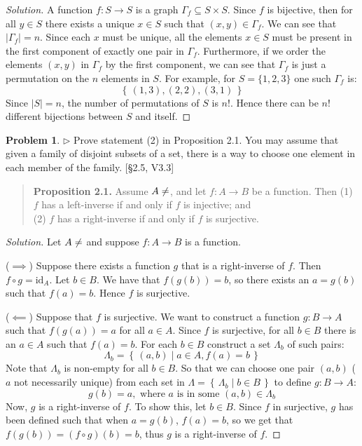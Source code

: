 \documentclass[fontsize=14pt]{scrartcl}
\theoremstyle{definition}
\newtheorem{problem-internal}{Problem}[subsection]
\newenvironment{problem}{
  \medskip
  \begin{problem-internal}
}{
  \end{problem-internal}
}
\newenvironment{solution}{
  \begin{proof}[Solution]
  \vspace{-8px}
  \setlength{\parskip}{4px}
  \setlength{\parindent}{0px}
}{
  \end{proof}
}
\newcommand{\set}[1]{\left\{\,#1\,\right\}}
\newcommand{\id}{\mathrm{id}}
\newcommand{\abs}[1]{\left|#1\right|}
\begin{document}
\begin{solution}
A function $f:S\to S$ is a graph $\Gamma_f\subseteq S\times S$. Since $f$ is
bijective, then for all $y\in S$ there exists a unique $x\in S$ such that
$(x,y)\in\Gamma_f$. We can see that $\abs{\Gamma_f} = n$. Since each $x$ must be
unique, all the elements $x\in S$ must be present in the first component of
exactly one pair in $\Gamma_f$. Furthermore, if we order the elements $(x,y)$ in
$\Gamma_f$ by the first component, we can see that $\Gamma_f$ is just a
permutation on the $n$ elements in $S$. For example, for $S=\{1,2,3\}$ one such
$\Gamma_f$ is:
%
\[ \set{ (1,3), (2,2), (3,1) } \]
%
Since $\abs{S} = n$, the number of permutations of $S$ is $n!$. Hence there can be
$n!$ different bijections between $S$ and itself.
\end{solution}


\begin{problem}
$\rhd$ Prove statement (2) in Proposition 2.1. You may assume that given a
family of disjoint subsets of a set, there is a way to choose one element in
each member of the family. [\S2.5, V3.3]

\begin{quote} \textbf{Proposition 2.1.} Assume $A\neq\empty$, and let $f:A\to B$ be a function. Then
(1) $f$ has a left-inverse if and only if $f$ is injective; and \\
(2) $f$ has a right-inverse if and only if $f$ is surjective.
\end{quote}
\end{problem}

\begin{solution}
Let $A\neq\empty$ and suppose $f:A\to B$ is a function.

($\implies$) Suppose there exists a function $g$ that is a right-inverse of $f$.
Then $f\circ g = \id_A$. Let $b\in B$. We have that $f(g(b)) = b$, so there
exists an $a = g(b)$ such that $f(a) = b$. Hence $f$ is surjective.

($\impliedby$) Suppose that $f$ is surjective. We want to construct a function
$g:B\to A$ such that $f(g(a)) = a$ for all $a\in A$. Since $f$ is surjective,
for all $b\in B$ there is an $a\in A$ such that $f(a) = b$. For each $b\in B$
construct a set $\Lambda_b$ of such pairs:
%
\[ \Lambda_b = \set{ (a,b) \mid a \in A, f(a) = b } \]
%
Note that $\Lambda_b$ is non-empty for all $b\in B$. So that we can choose one
pair $(a,b)$ ($a$ not necessarily unique) from each set in $\Lambda =
\set{\Lambda_b\mid b\in B}$ to define $g:B\to A$:
%
\[ g(b) = a, \text{ where $a$ is in some $(a,b)\in\Lambda_b$} \]
%
Now, $g$ is a right-inverse of $f$. To show this, let $b\in B$. Since $f$ in
surjective, $g$ has been defined such that when $a=g(b)$, $f(a)=b$, so we get
that $f(g(b)) = (f\circ g)(b) = b$, thus $g$ is a right-inverse of $f$.
\end{solution}
\end{document}
